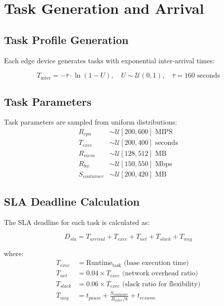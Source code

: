 \documentclass[12pt,a4paper]{article}
\begin{document}
\section{Task Generation and Arrival}

\subsection{Task Profile Generation}

Each edge device generates tasks with exponential inter-arrival times:

\begin{equation}
    T_{\text{inter}} = -\bar{\tau} \cdot \ln(1 - U), \quad U \sim \mathcal{U}(0,1), \quad \bar{\tau} = 160 \text{ seconds}
\end{equation}

\subsection{Task Parameters}

Task parameters are sampled from uniform distributions:
\begin{align}
    R_{cpu} &\sim \mathcal{U}[200, 600] \text{ MIPS} \\
    T_{exec} &\sim \mathcal{U}[200, 400] \text{ seconds} \\
    R_{mem} &\sim \mathcal{U}[128, 512] \text{ MB} \\
    R_{bw} &\sim \mathcal{U}[150, 550] \text{ Mbps} \\
    S_{container} &\sim \mathcal{U}[200, 420] \text{ MB}
\end{align}

\subsection{SLA Deadline Calculation}

The SLA deadline for each task is calculated as:

\begin{equation}
    D_{sla} = T_{arrival} + T_{exec} + T_{net} + T_{slack} + T_{mig}
\end{equation}

where:
\begin{align}
    T_{exec} &= \text{Runtime}_{\text{task}} \text{ (base execution time)} \\
    T_{net} &= 0.04 \times T_{exec} \text{ (network overhead ratio)} \\
    T_{slack} &= 0.06 \times T_{exec} \text{ (slack ratio for flexibility)} \\
    T_{mig} &= t_{pause} + \frac{S_{container}}{B_{inter}/8} + t_{resume}
\end{align}
\end{document}
